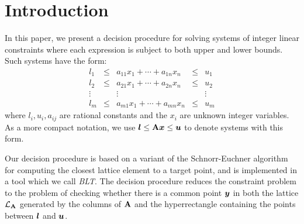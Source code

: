 \section{Introduction}
\label{sec:intro}


In this paper, we present a decision procedure for solving systems of
integer linear constraints where each expression is subject
to both upper and lower bounds.  Such systems have the form:
%
\begin{equation}
    \label{eq:prob-inequalities}
    \begin{array}{ccccc}
        l_1    & \le & a_{11} x_1 + \cdots + a_{1n} x_n & \le & u_1 \\
        l_2    & \le & a_{21} x_1 + \cdots + a_{2n} x_n & \le & u_2 \\
        \vdots &     & \vdots                         &     & \vdots \\
        l_m    & \le & a_{m1} x_1 + \cdots + a_{mn} x_n & \le & u_m
    \end{array}
\end{equation}
%
where $l_i, u_i, a_{ij}$ are rational constants and the $x_i$ are unknown
integer variables.
%
As a more compact notation, we use $\boldsymbol{l} \le \mathbf{A} \boldsymbol{x} \le \boldsymbol{u}$
to denote systems with this form.



Our decision procedure is based on a variant of the Schnorr-Euchner
algorithm~\cite{Schnorr-Euchner} for computing the closest lattice
element to a target point, and is implemented in a tool which we call
\emph{BLT}.  The decision procedure reduces the constraint problem to
the problem of checking whether there is a common point $\boldsymbol{y}$ in
both the lattice $\mathcal{L}_{\mathbf{A}}$ generated by the columns of $\mathbf{A}$
and the hyperrectangle containing the points between $\boldsymbol{l}$ and
$\boldsymbol{u}$.



